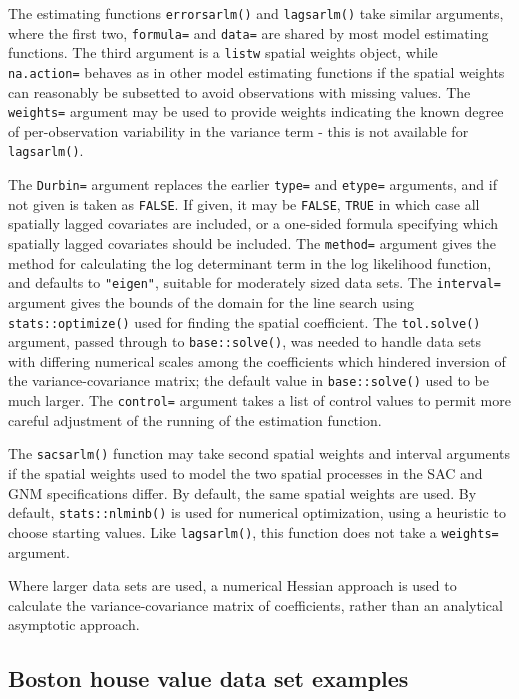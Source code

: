 \documentclass[]{book}
\begin{document}
The estimating functions \texttt{errorsarlm()} and \texttt{lagsarlm()} take similar arguments, where the first two, \texttt{formula=} and \texttt{data=} are shared by most model estimating functions. The third argument is a \texttt{listw} spatial weights object, while \texttt{na.action=} behaves as in other model estimating functions if the spatial weights can reasonably be subsetted to avoid observations with missing values. The \texttt{weights=} argument may be used to provide weights indicating the known degree of per-observation variability in the variance term - this is not available for \texttt{lagsarlm()}.

The \texttt{Durbin=} argument replaces the earlier \texttt{type=} and \texttt{etype=} arguments, and if not given is taken as \texttt{FALSE}. If given, it may be \texttt{FALSE}, \texttt{TRUE} in which case all spatially lagged covariates are included, or a one-sided formula specifying which spatially lagged covariates should be included. The \texttt{method=} argument gives the method for calculating the log determinant term in the log likelihood function, and defaults to \texttt{"eigen"}, suitable for moderately sized data sets. The \texttt{interval=} argument gives the bounds of the domain for the line search using \texttt{stats::optimize()} used for finding the spatial coefficient. The \texttt{tol.solve()} argument, passed through to \texttt{base::solve()}, was needed to handle data sets with differing numerical scales among the coefficients which hindered inversion of the variance-covariance matrix; the default value in \texttt{base::solve()} used to be much larger. The \texttt{control=} argument takes a list of control values to permit more careful adjustment of the running of the estimation function.

The \texttt{sacsarlm()} function may take second spatial weights and interval arguments if the spatial weights used to model the two spatial processes in the SAC and GNM specifications differ. By default, the same spatial weights are used. By default, \texttt{stats::nlminb()} is used for numerical optimization, using a heuristic to choose starting values. Like \texttt{lagsarlm()}, this function does not take a \texttt{weights=} argument.

Where larger data sets are used, a numerical Hessian approach is used to calculate the variance-covariance matrix of coefficients, rather than an analytical asymptotic approach.

\hypertarget{boston-house-value-data-set-examples}{%
\subsection{Boston house value data set examples}\label{boston-house-value-data-set-examples}}
\end{document}
